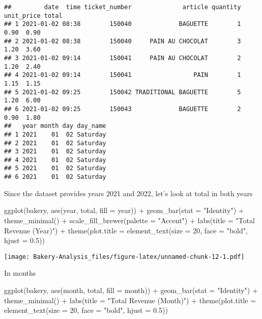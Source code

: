 \documentclass[
]{article}
\newenvironment{Shaded}{\begin{snugshade}}{\end{snugshade}}
\newcommand{\AttributeTok}[1]{\textcolor[rgb]{0.77,0.63,0.00}{#1}}
\newcommand{\DecValTok}[1]{\textcolor[rgb]{0.00,0.00,0.81}{#1}}
\newcommand{\FloatTok}[1]{\textcolor[rgb]{0.00,0.00,0.81}{#1}}
\newcommand{\FunctionTok}[1]{\textcolor[rgb]{0.00,0.00,0.00}{#1}}
\newcommand{\NormalTok}[1]{#1}
\newcommand{\SpecialCharTok}[1]{\textcolor[rgb]{0.00,0.00,0.00}{#1}}
\newcommand{\StringTok}[1]{\textcolor[rgb]{0.31,0.60,0.02}{#1}}
\begin{document}
\begin{verbatim}
##         date  time ticket_number              article quantity unit_price total
## 1 2021-01-02 08:38        150040             BAGUETTE        1       0.90  0.90
## 2 2021-01-02 08:38        150040     PAIN AU CHOCOLAT        3       1.20  3.60
## 3 2021-01-02 09:14        150041     PAIN AU CHOCOLAT        2       1.20  2.40
## 4 2021-01-02 09:14        150041                 PAIN        1       1.15  1.15
## 5 2021-01-02 09:25        150042 TRADITIONAL BAGUETTE        5       1.20  6.00
## 6 2021-01-02 09:25        150043             BAGUETTE        2       0.90  1.80
##   year month day day_name
## 1 2021    01  02 Saturday
## 2 2021    01  02 Saturday
## 3 2021    01  02 Saturday
## 4 2021    01  02 Saturday
## 5 2021    01  02 Saturday
## 6 2021    01  02 Saturday
\end{verbatim}

Since the dataset provides years 2021 and 2022, let's look at total in
both years

\begin{Shaded}
\begin{Highlighting}[]
\FunctionTok{ggplot}\NormalTok{(bakery, }\FunctionTok{aes}\NormalTok{(year, total, }\AttributeTok{fill =}\NormalTok{ year)) }\SpecialCharTok{+} \FunctionTok{geom\_bar}\NormalTok{(}\AttributeTok{stat =} \StringTok{"Identity"}\NormalTok{) }\SpecialCharTok{+} \FunctionTok{theme\_minimal}\NormalTok{() }\SpecialCharTok{+} \FunctionTok{scale\_fill\_brewer}\NormalTok{(}\AttributeTok{palette =} \StringTok{"Accent"}\NormalTok{) }\SpecialCharTok{+} \FunctionTok{labs}\NormalTok{(}\AttributeTok{title =} \StringTok{"Total Revenue (Year)"}\NormalTok{) }\SpecialCharTok{+} \FunctionTok{theme}\NormalTok{(}\AttributeTok{plot.title =} \FunctionTok{element\_text}\NormalTok{(}\AttributeTok{size =} \DecValTok{20}\NormalTok{, }\AttributeTok{face =} \StringTok{"bold"}\NormalTok{, }\AttributeTok{hjust =} \FloatTok{0.5}\NormalTok{))}
\end{Highlighting}
\end{Shaded}

\texttt{[image: Bakery-Analysis\_files/figure-latex/unnamed-chunk-12-1.pdf]}

In months

\begin{Shaded}
\begin{Highlighting}[]
\FunctionTok{ggplot}\NormalTok{(bakery, }\FunctionTok{aes}\NormalTok{(month, total, }\AttributeTok{fill =}\NormalTok{ month)) }\SpecialCharTok{+} \FunctionTok{geom\_bar}\NormalTok{(}\AttributeTok{stat =} \StringTok{"Identity"}\NormalTok{) }\SpecialCharTok{+} \FunctionTok{theme\_minimal}\NormalTok{() }\SpecialCharTok{+} \FunctionTok{labs}\NormalTok{(}\AttributeTok{title =} \StringTok{"Total Revenue (Month)"}\NormalTok{) }\SpecialCharTok{+} \FunctionTok{theme}\NormalTok{(}\AttributeTok{plot.title =} \FunctionTok{element\_text}\NormalTok{(}\AttributeTok{size =} \DecValTok{20}\NormalTok{, }\AttributeTok{face =} \StringTok{"bold"}\NormalTok{, }\AttributeTok{hjust =} \FloatTok{0.5}\NormalTok{))}
\end{Highlighting}
\end{Shaded}
\end{document}
